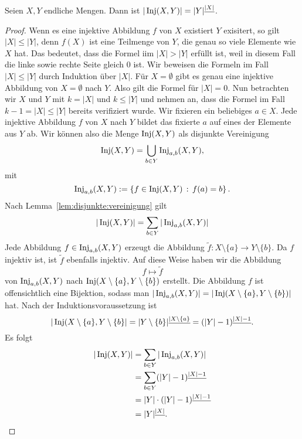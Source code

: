\begin{thm} \label{thm:inj:abbildungen}
	Seien $X,Y$ endliche Mengen. Dann ist $|\operatorname{Inj}(X,Y) | = |Y|^{\underline{|X|}}$. 
\end{thm} 
\begin{proof} 
	Wenn es eine injektive Abbildung $f$ von $X$ existiert $Y$ exisitert, so gilt $|X| \le |Y|$, denn $f(X)$ ist eine Teilmenge von $Y$, die genau so viele Elemente wie $X$ hat. Das bedeutet, dass die Formel iim $|X| > |Y|$ erfüllt ist, weil in diesem Fall die linke sowie rechte Seite gleich $0$ ist. Wir beweisen die Formeln im Fall $|X| \le |Y|$ durch Induktion über $|X|$. Für $X = \emptyset$ gibt es genau eine injektive Abbildung von $X= \emptyset$ nach $Y$. Also gilt die Formel für $|X|=0$. 
	Nun betrachten wir $X$ und $Y$ mit $k=|X|$ und $k \le |Y|$ und nehmen an, dass die Formel im Fall $k-1=|X| \le |Y|$ bereits verifiziert wurde. Wir fixieren ein beliebiges $a \in X$. Jede injektive Abbildung $f$ von $X$ nach $Y$ bildet das fixierte $a$ auf eines der Elemente aus $Y$ ab. Wir können also die Menge $\operatorname{Inj}(X,Y)$ als disjunkte Vereinigung 
	\[
			\operatorname{Inj}(X,Y) = \bigcup_{b \in Y} \operatorname{Inj}_{a,b}(X,Y),
	\]
	mit 
	\[
		\operatorname{Inj}_{a,b} (X,Y) := \left\{  f \in \operatorname{Inj}(X,Y) \,:\, f(a) = b \right\}. 
	\]
	Nach Lemma~\ref{lem:disjunkte:vereinigung} gilt 
	\[
			|\operatorname{Inj}(X,Y)| = \sum_{b \in Y} |\operatorname{Inj}_{a,b}(X,Y)|
	\]
	Jede Abbildung $f  \in \operatorname{Inj}_{a,b}(X,Y)$ erzeugt die Abbildung $\tilde{f} : X \setminus \{a\} \to Y \setminus \{b\}$. Da $f$ injektiv ist, ist $\tilde{f}$ ebenfalls injektiv. Auf diese Weise haben wir die Abbildung 
	\[
				f \mapsto \tilde{f} 
	\]
	von $\operatorname{Inj}_{a,b}(X,Y)$ nach $\operatorname{Inj}(X \setminus \{a\}, Y \setminus \{b\})$ erstellt. Die Abbildung $f$ ist offensichtlich eine Bijektion, sodass man $|\operatorname{Inj}_{a,b}(X,Y)| = |\operatorname{Inj}(X \setminus \{a\},Y \setminus \{b\})|$ hat. Nach der Induktionsvoraussetzung ist 
	\[
		|\operatorname{Inj}(X \setminus \{a\}, Y \setminus \{b\} | = |Y \setminus \{b\}|^{\underline{|X \setminus \{a\}}} = (|Y| -1)^{\underline{|X|-1}}.
	\] 
	Es folgt 
	\begin{align*}
	|\operatorname{Inj}(X,Y)| & = \sum_{b \in Y} |\operatorname{Inj}_{a,b}(X,Y)| 
		\\ & = \sum_{b \in Y} (|Y| -1)^{\underline{|X|-1}} 
		\\ & = |Y| \cdot (|Y| -1)^{\underline{|X|-1}}
		\\ & = |Y|^{\underline{|X|}}. 
	\end{align*}
\end{proof} 

